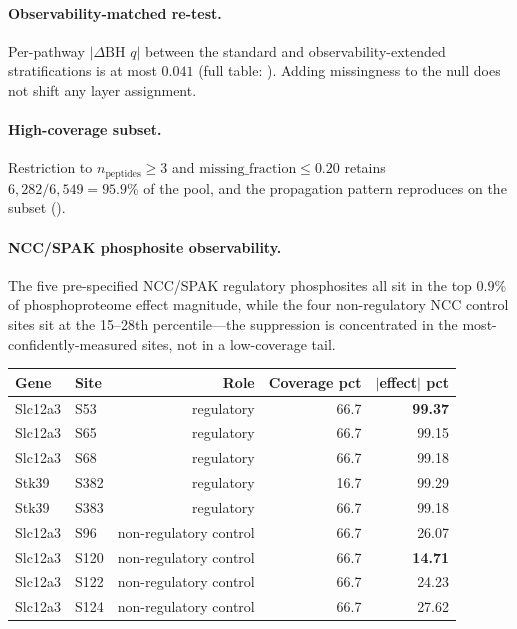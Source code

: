 \documentclass[10pt]{article}
\begin{document}
\paragraph{Observability-matched re-test.} Per-pathway $|\Delta\text{BH }q|$ between the standard and observability-extended stratifications is at most $0.041$ (full table: ). Adding missingness to the null does not shift any layer assignment.

\paragraph{High-coverage subset.} Restriction to $n_\text{peptides}\ge3$ and $\text{missing\_fraction}\le0.20$ retains $6{,}282/6{,}549=95.9\%$ of the pool, and the propagation pattern reproduces on the subset ().

\paragraph{NCC/SPAK phosphosite observability.} The five pre-specified NCC/SPAK regulatory phosphosites all sit in the top $0.9\%$ of phosphoproteome effect magnitude, while the four non-regulatory NCC control sites sit at the 15--28th percentile---the suppression is concentrated in the most-confidently-measured sites, not in a low-coverage tail.

\begin{table}[h]
\centering
\small
\begin{tabular}{llrrr}
\toprule
Gene & Site & Role & Coverage pct & $|$effect$|$ pct \\
\midrule
Slc12a3 & S53  & regulatory & 66.7 & \textbf{99.37} \\
Slc12a3 & S65  & regulatory & 66.7 & 99.15 \\
Slc12a3 & S68  & regulatory & 66.7 & 99.18 \\
Stk39   & S382 & regulatory & 16.7 & 99.29 \\
Stk39   & S383 & regulatory & 66.7 & 99.18 \\
Slc12a3 & S96  & non-regulatory control & 66.7 & 26.07 \\
Slc12a3 & S120 & non-regulatory control & 66.7 & \textbf{14.71} \\
Slc12a3 & S122 & non-regulatory control & 66.7 & 24.23 \\
Slc12a3 & S124 & non-regulatory control & 66.7 & 27.62 \\
\bottomrule
\end{tabular}
\end{table}
\end{document}
